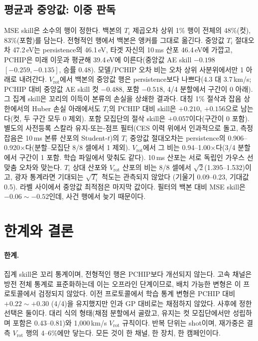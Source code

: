 \documentclass[10pt,twocolumn,letterpaper]{article}
\newcommand{\Ti}{\ensuremath{T_i}}
\newcommand{\Vrot}{\ensuremath{V_\mathrm{rot}}}
\begin{document}
\subsection{평균과 중앙값: 이중 판독}
\label{sec:res:dual}
MSE skill은 소수의 행이 정한다. 백본의 \Ti{} 제곱오차 상위 1\% 행이 전체의 48\%(컷),
83\%(포함)를 담는다. 전형적인 행에서 백본은 앵커를 그대로 옮긴다. 중앙값 \Ti{} 절대오차
47.2\,eV는 persistence의 46.1\,eV, 타겟 자신의 10\,ms 산포 46.4\,eV에 가깝고, PCHIP은 미래
이웃과 평균해 39.4\,eV에 이른다(중앙값 AE skill $-0.198$ $[-0.259, -0.135]$, 승률 0.48).
모델/PCHIP 오차 비는 오차 상위 사분위에서만 1 아래로 내려간다. \Vrot{}에서 백본의 중앙값
행은 persistence보다 나쁘다(4.3 대 3.7\,km/s; PCHIP 대비 중앙값 AE skill 컷 $-0.488$, 포함
$-0.518$, 4/4 분할에서 구간이 0 아래). 그 집계 skill은 꼬리의 이득이 본류의 손실을 상쇄한
결과다. 대칭 1\% 절삭과 잡음 상한에서의 Huber 손실 아래에서도 \Ti{}의 PCHIP 대비 skill은
$+0.210$, $+0.156$으로 남는다(컷, 두 구간 모두 0 제외). 포함 모집단의 절삭 skill은
$+0.057$이다(구간이 0 포함). 별도의 사전등록 스칼라 유지-또는-점프 필터(CES 이력 위에서
인과적으로 돌고, 측정 잡음은 10\,ms 본류 산포의 Student-$t$)의 \Ti{} 중앙값 절대오차는
persistence의 0.906--0.920$\times$다(분할--모집단 8/8 셀에서 1 제외). \Vrot{}에서 그 비는
0.94--1.00$\times$다(3/4 분할에서 구간이 1 포함. 학습 파일에서 맞춰도 같다). 10\,ms 산포는 서로 독립인
가우스 선 맞춤 오차와 맞는다. \Ti{} 상대 산포와 \Vrot{} 산포의 비는 8/8 셀에서
$\sqrt2$(1.395--1.532)이고, 광자 통계라면 기대되는 $\sqrt{T_i}$ 척도는 관측되지 않았다
(기울기 0.09--0.23, 기대값 0.5). 라벨 사이에서 중앙값 최적점은 마지막 값이다. 필터의 백본
대비 MSE skill은 $-0.06\sim-0.52$인데, 사건 행에서 늦기 때문이다.

\section{한계와 결론}
\label{sec:conclusion}

\paragraph{한계.} 집계 skill은 꼬리 통계이며, 전형적인 행은 PCHIP보다 개선되지 않는다.
고속 채널은 방전 전체 통계로 표준화하는데 이는 오프라인 단계이므로, 배치 가능한 변형은 이
프로토콜에서 검정되지 않았다. 이전 프로토콜에서 학습 통계 변형은 PCHIP 대비 $+0.22\sim+0.30$
(4/4)을 유지했지만 인과 GP 대비로는 채점하지 않았다. 사후에 정한 선택은 둘이다. 대리 식의
형태(채점 분할에서 골랐고, 유지는 컷 모집단에서만 성립하며 포함은 0.43--0.81)와
1{,}000\,km/s \Vrot{} 규칙이다. 반복 단위는 shot이며, 재가중은 결측 \Vrot{} 행의 4--6\%에만
닿는다. 모든 것이 한 채널, 한 장치, 한 캠페인이다.
\end{document}
